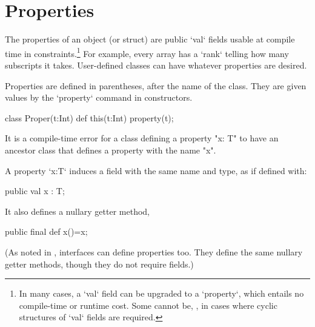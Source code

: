 

\section{Properties}
\label{PropertiesInClasses}

The properties of an object (or struct) are  public \xcd`val` fields
usable at compile time in constraints.\footnote{In many cases, a 
\xcd`val` field can be upgraded to a \xcd`property`, which 
entails no compile-time or runtime cost.  Some cannot be, \eg, in cases where
cyclic structures of \xcd`val` fields are required.} 
For example,  every array has a \xcd`rank` telling
how many subscripts it takes.  User-defined classes can have whatever
properties are desired. 

Properties are defined in parentheses, after the name of the class.  They are
given values by the \xcd`property` command in constructors.
\begin{xten}
class Proper(t:Int) {
  def this(t:Int) {property(t);}
}
\end{xten}
%




\begin{staticrule*}
It is a compile-time error for a class
defining a property \xcd"x: T" to have an ancestor class that defines
a property with the name \xcd"x".  
\end{staticrule*}

A property \xcd`x:T` induces a field with the same name and type, 
as if defined with: 
\begin{xten}
public val x : T;
\end{xten} 
\noindent It also defines a nullary getter method, 
\begin{xten}
public final def x()=x;
\end{xten}

\noindent (As noted in , interfaces can define
properties too. They define the same nullary getter methods, though they do
not require fields.)


